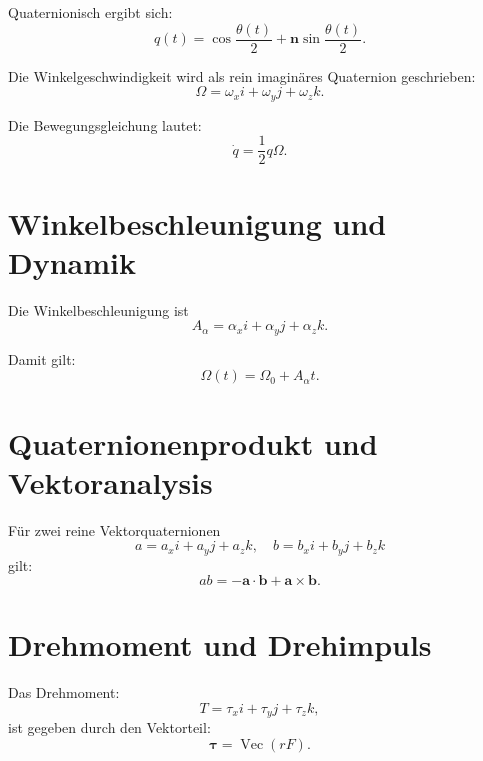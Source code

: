 \documentclass[11pt]{article}
\begin{document}
	Quaternionisch ergibt sich:
	\begin{equation}
		q(t)
		=
		\cos\frac{\theta(t)}{2}
		+
		\mathbf n \sin\frac{\theta(t)}{2}.
	\end{equation}
	
	Die Winkelgeschwindigkeit wird als rein imaginäres Quaternion geschrieben:
	\begin{equation}
		\Omega = \omega_x i + \omega_y j + \omega_z k.
	\end{equation}
	
	Die Bewegungsgleichung lautet:
	\begin{equation}
		\dot q = \frac12 q \Omega.
	\end{equation}
	
	\section{Winkelbeschleunigung und Dynamik}
	
	Die Winkelbeschleunigung ist
	\begin{equation}
		A_\alpha = \alpha_x i + \alpha_y j + \alpha_z k.
	\end{equation}
	
	Damit gilt:
	\begin{equation}
		\Omega(t) = \Omega_0 + A_\alpha t.
	\end{equation}
	
	\section{Quaternionenprodukt und Vektoranalysis}
	
	Für zwei reine Vektorquaternionen
	\begin{equation}
		a = a_x i + a_y j + a_z k,\quad
		b = b_x i + b_y j + b_z k
	\end{equation}
	gilt:
	\begin{equation}
		ab
		=
		-\mathbf a \cdot \mathbf b
		+
		\mathbf a \times \mathbf b.
	\end{equation}
	
	\section{Drehmoment und Drehimpuls}
	
	Das Drehmoment:
	\begin{equation}
		T = \tau_x i + \tau_y j + \tau_z k,
	\end{equation}
	ist gegeben durch den Vektorteil:
	\begin{equation}
		\boldsymbol\tau = \operatorname{Vec}(rF).
	\end{equation}
	
\end{document}
